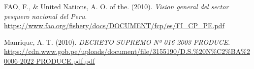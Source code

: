 \documentclass[
  12pt,
  letterpaper,
]{scrreprt}
\newlength{\cslhangindent}
\newenvironment{CSLReferences}[2] %
 {\begin{list}{}{%
  \setlength{\itemindent}{0pt}
  \setlength{\leftmargin}{0pt}
  \setlength{\parsep}{0pt}
  \ifodd #1
   \setlength{\leftmargin}{\cslhangindent}
   \setlength{\itemindent}{-1\cslhangindent}
  \fi
  \setlength{\itemsep}{#2\baselineskip}}}
 {\end{list}}
\begin{document}

\label{refs}
\begin{CSLReferences}{1}{0}
FAO, F., \& United Nations, A. O. of the. (2010). \emph{Vision general
del sector pesquero nacional del Peru}.
\url{https://www.fao.org/fishery/docs/DOCUMENT/fcp/es/FI_CP_PE.pdf}

Manrique, A. T. (2010). \emph{DECRETO SUPREMO Nº 016-2003-PRODUCE}.
\url{https://cdn.www.gob.pe/uploads/document/file/3155190/D.S.\%20N\%C2\%BA\%20006-2022-PRODUCE.pdf.pdf}

\end{CSLReferences}
\end{document}
